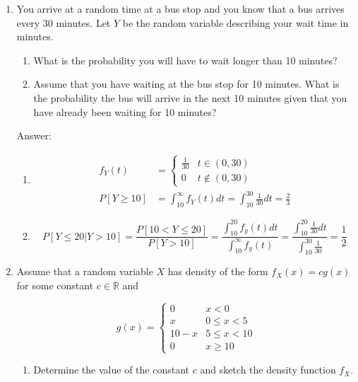 \documentclass{article}
\begin{document}
\begin{enumerate}
\newpage
\item

You arrive at a random time at a bus stop and you know that a bus arrives every 30 minutes. Let $Y$ be the random variable describing your wait time in minutes. 

\begin{enumerate}

\item
What is the probability you will have to wait longer than 10 minutes?

\item
Assume that you have waiting at the bus stop for 10 minutes. What is the probability the bus will arrive in the next 10 minutes given that you have already been waiting for 10 minutes?
\end{enumerate}

Answer:

\begin{enumerate}
\item
\begin{align*}
f_Y(t) &= \begin{cases}
		\frac{1}{30} & t \in (0,30) \\
		0 & t \notin (0,30)
		\end{cases} \\
P[Y \geq 10] &= \int_{10}^\infty f_Y(t)  dt = \int_{10}^{30} \frac{1}{30} dt = \boxed{\frac{2}{3}}
\end{align*}

\item
$$
P[Y \leq 20 | Y > 10] = \frac{P[10 < Y \leq 20]}{P[Y > 10]}
= \frac{\int_{10}^{20} f_y(t) dt}{\int_{10}^\infty f_y(t)}
= \frac{\int_{10}^{20} \frac{1}{30} dt}{\int_{10}^{30} \frac{1}{30}} = \boxed{\frac{1}{2}}
$$

\end{enumerate}

\item
Assume that a random variable $X$ has density of the form $f_X(x) = cg(x)$ for some constant $c \in \mathbb{R}$ and 

$$
g(x) =
	\begin{cases}
	0 & x < 0 \\
	x & 0 \leq x < 5 \\
	10-x & 5 \leq x < 10 \\
	0 & x \geq 10
	\end{cases}
$$

\begin{enumerate}
\item 
Determine the value of the constant $c$ and sketch the density function $f_X$. 


\end{enumerate}
\end{enumerate}
\end{document}
